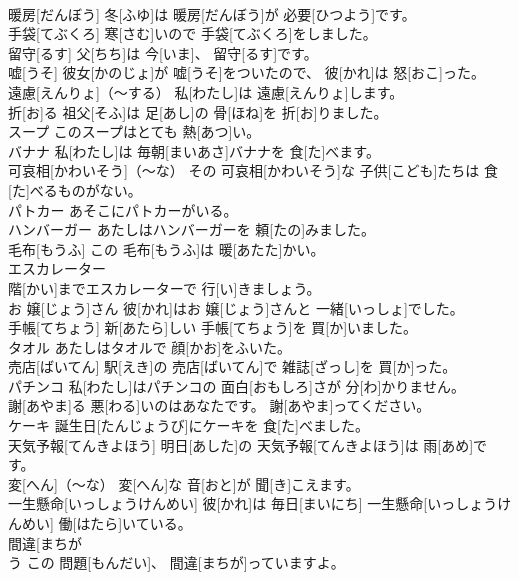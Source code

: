 \documentclass[8pt]{extreport}
\begin{document}
\begin{CJK}{UTF8}{min}
\\	暖房[だんぼう]	冬[ふゆ]は 暖房[だんぼう]が 必要[ひつよう]です。		
\\	手袋[てぶくろ]	寒[さむ]いので 手袋[てぶくろ]をしました。		
\\	留守[るす]	父[ちち]は 今[いま]、 留守[るす]です。		
\\	嘘[うそ]	彼女[かのじょ]が 嘘[うそ]をついたので、 彼[かれ]は 怒[おこ]った。		
\\	遠慮[えんりょ]（～する）	私[わたし]は 遠慮[えんりょ]します。		
\\	折[お]る	祖父[そふ]は 足[あし]の 骨[ほね]を 折[お]りました。		
\\	スープ	このスープはとても 熱[あつ]い。		
\\	バナナ	私[わたし]は 毎朝[まいあさ]バナナを 食[た]べます。		
\\	可哀相[かわいそう]（～な）	その 可哀相[かわいそう]な 子供[こども]たちは 食[た]べるものがない。		
\\	パトカー	あそこにパトカーがいる。		
\\	ハンバーガー	あたしはハンバーガーを 頼[たの]みました。		
\\	毛布[もうふ]	この 毛布[もうふ]は 暖[あたた]かい。		
\\	エスカレーター	
\\	階[かい]までエスカレーターで 行[い]きましょう。		
\\	お 嬢[じょう]さん	彼[かれ]はお 嬢[じょう]さんと 一緒[いっしょ]でした。		
\\	手帳[てちょう]	新[あたら]しい 手帳[てちょう]を 買[か]いました。		
\\	タオル	あたしはタオルで 顔[かお]をふいた。		
\\	売店[ばいてん]	駅[えき]の 売店[ばいてん]で 雑誌[ざっし]を 買[か]った。		
\\	パチンコ	私[わたし]はパチンコの 面白[おもしろ]さが 分[わ]かりません。		
\\	謝[あやま]る	悪[わる]いのはあなたです。 謝[あやま]ってください。		
\\	ケーキ	誕生日[たんじょうび]にケーキを 食[た]べました。		
\\	天気予報[てんきよほう]	明日[あした]の 天気予報[てんきよほう]は 雨[あめ]です。		
\\	変[へん]（～な）	変[へん]な 音[おと]が 聞[き]こえます。		
\\	一生懸命[いっしょうけんめい]	彼[かれ]は 毎日[まいにち] 一生懸命[いっしょうけんめい] 働[はたら]いている。		
\\	間違[まちが
\\	う	この 問題[もんだい]、 間違[まちが]っていますよ。		

\end{CJK}
\end{document}
